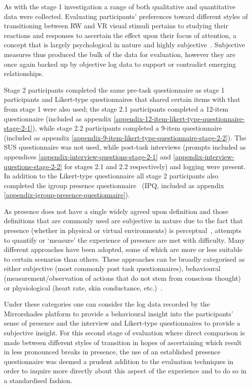 As with the stage 1 investigation a range of both qualitative and quantitative data were collected. Evaluating participants' preferences toward different styles of transitioning between RW and VR visual stimuli pertains to studying their reactions and responses to ascertain the effect upon their focus of attention, a concept that is largely psychological in nature and highly subjective~\cite{Ijsselsteijn2001}. Subjective measures thus produced the bulk of the data for evaluation, however they are once again backed up by objective log data to support or contradict emerging relationships.

Stage 2 participants completed the same pre-task questionnaire as stage 1 participants and Likert-type questionnaires that shared certain items with that from stage 1 were also used; the stage 2.1 participants completed a 12-item questionnaire (included as appendix \ref{appendix-12-item-likert-type-questionnaire-stage-2-1}), while stage 2.2 participants completed a 9-item questionnaire (included as appendix \ref{appendix-9-item-likert-type-questionnaire-stage-2-2}). The SUS questionnaire was not used, while post-task interviews (prompts included as appendices \ref{appendix-interview-questions-stage-2-1} and \ref{appendix-interview-questions-stage-2-2} for stages 2.1 and 2.2 respectively) and logging were present. In addition to the Likert-type questionnaire all stage 2 participants also completed the igroup presence questionnaire~\cite{Schubert2001} (IPQ, included as appendix \ref{appendix-igroup-presence-questionnaire}).

As presence does not have a single widely agreed upon definition and those definitions that are commonly used are subjective in nature due to the fact that presence (whether in physical or virtual environments) is perceptual~\cite{Waterworth2014}, attempts to quantify or `measure' the experience of presence are met with difficulty. Many different approaches have been adopted, some of which are more or less suitable to certain scenarios than others. These approaches can be broadly categorised as either subjective (most commonly post task questionnaires), behavioural (measurement/observation of actions that do not stem from conscious thought) or physiological (heart rate, skin conductance, etc.)~\cite{Insko2003}.

Under these categories one can consider the log data recorded by the Mirrorshades platform to provide a behavioural insight into the participants' sense of presence and the interview and Likert-type questionnaires to provide a subjective insight. For this second stage of evaluation where direct comparison is made between different styles of transition in hopes of ascertaining which result in less pronounced breaks in presence, the use of an established presence questionnaire was deemed a prudent addition to the evaluation techniques in order to inquire more directly about this aspect of the experience and to do so in a standardised fashion.

